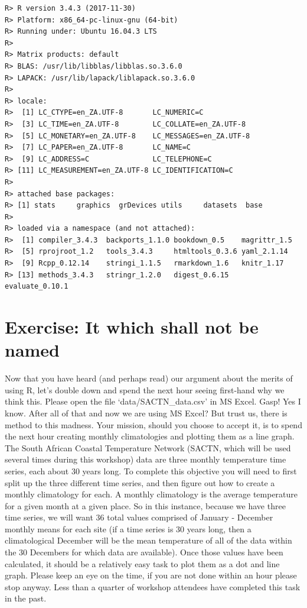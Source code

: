 \documentclass[]{book}
\theoremstyle{definition}
\theoremstyle{definition}
\theoremstyle{definition}
\theoremstyle{remark}
\begin{document}
\begin{verbatim}
R> R version 3.4.3 (2017-11-30)
R> Platform: x86_64-pc-linux-gnu (64-bit)
R> Running under: Ubuntu 16.04.3 LTS
R> 
R> Matrix products: default
R> BLAS: /usr/lib/libblas/libblas.so.3.6.0
R> LAPACK: /usr/lib/lapack/liblapack.so.3.6.0
R> 
R> locale:
R>  [1] LC_CTYPE=en_ZA.UTF-8       LC_NUMERIC=C              
R>  [3] LC_TIME=en_ZA.UTF-8        LC_COLLATE=en_ZA.UTF-8    
R>  [5] LC_MONETARY=en_ZA.UTF-8    LC_MESSAGES=en_ZA.UTF-8   
R>  [7] LC_PAPER=en_ZA.UTF-8       LC_NAME=C                 
R>  [9] LC_ADDRESS=C               LC_TELEPHONE=C            
R> [11] LC_MEASUREMENT=en_ZA.UTF-8 LC_IDENTIFICATION=C       
R> 
R> attached base packages:
R> [1] stats     graphics  grDevices utils     datasets  base     
R> 
R> loaded via a namespace (and not attached):
R>  [1] compiler_3.4.3  backports_1.1.0 bookdown_0.5    magrittr_1.5   
R>  [5] rprojroot_1.2   tools_3.4.3     htmltools_0.3.6 yaml_2.1.14    
R>  [9] Rcpp_0.12.14    stringi_1.1.5   rmarkdown_1.6   knitr_1.17     
R> [13] methods_3.4.3   stringr_1.2.0   digest_0.6.15   evaluate_0.10.1
\end{verbatim}

\section{Exercise: It which shall not be
named}\label{exercise-it-which-shall-not-be-named}

Now that you have heard (and perhaps read) our argument about the merits
of using R, let's double down and spend the next hour seeing first-hand
why we think this. Please open the file `data/SACTN\_data.csv' in MS
Excel. Gasp! Yes I know. After all of that and now we are using MS
Excel? But trust us, there is method to this madness. Your mission,
should you choose to accept it, is to spend the next hour creating
monthly climatologies and plotting them as a line graph. The South
African Coastal Temperature Network (SACTN, which will be used several
times during this workshop) data are three monthly temperature time
series, each about 30 years long. To complete this objective you will
need to first split up the three different time series, and then figure
out how to create a monthly climatology for each. A monthly climatology
is the average temperature for a given month at a given place. So in
this instance, because we have three time series, we will want 36 total
values comprised of January - December monthly means for each site (if a
time series is 30 years long, then a climatological December will be the
mean temperature of all of the data within the 30 Decembers for which
data are available). Once those values have been calculated, it should
be a relatively easy task to plot them as a dot and line graph. Please
keep an eye on the time, if you are not done within an hour please stop
anyway. Less than a quarter of workshop attendees have completed this
task in the past.
\end{document}
